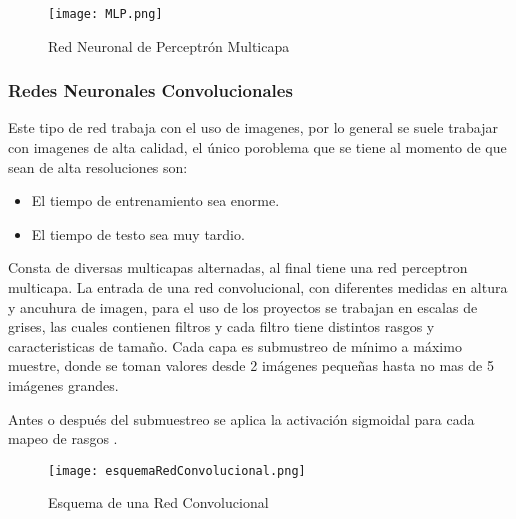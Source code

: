             \begin{figure}[H]
                \centering
                \texttt{[image: MLP.png]}
                \caption{Red Neuronal de Perceptr\'on Multicapa \cite{liu2015}}
                \label{fig:fig1}
            \end{figure}

        \subsubsection{Redes Neuronales Convolucionales}

            Este tipo de red trabaja con el uso de imagenes, por lo general se suele trabajar con imagenes de alta calidad, el \'unico poroblema que se tiene 
            al momento de que sean de alta resoluciones son:
            \begin{itemize}
                \item El tiempo de entrenamiento sea enorme.
                \item El tiempo de testo sea muy tardio.
            \end{itemize}

            Consta de diversas multicapas alternadas, al final tiene una red perceptron multicapa.
            La entrada de una red convolucional, con diferentes medidas en altura y ancuhura de imagen, para el uso 
            de los proyectos se trabajan en escalas de grises, las cuales contienen filtros y cada filtro tiene distintos 
            rasgos y caracteristicas de tamaño. Cada capa es submustreo de m\'inimo a m\'aximo muestre, donde se toman valores 
            desde 2 im\'agenes pequeñas hasta no mas de 5 im\'agenes grandes.

            Antes o despu\'es del submuestreo se aplica la activaci\'on sigmoidal para cada mapeo de rasgos \cite{duran2017}.

            \begin{figure}[H]
                \centering
                \texttt{[image: esquemaRedConvolucional.png]}
                \caption{Esquema de una Red Convolucional \cite{duran2017}}
                \label{fig:fig2}
            \end{figure}